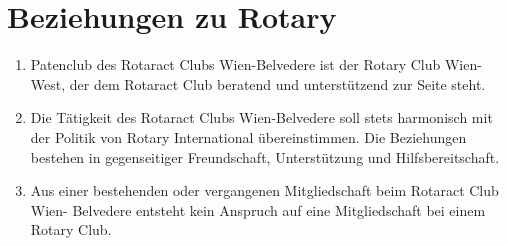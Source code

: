 \documentclass{statutclass}
\begin{document}
\section{Beziehungen zu Rotary}
\begin{enumerate}
    \item Patenclub des Rotaract Clubs Wien-Belvedere ist der Rotary Club Wien-West, der dem Rotaract Club beratend und unterstützend zur Seite steht.
    \item Die Tätigkeit des Rotaract Clubs Wien-Belvedere soll stets harmonisch mit der Politik von Rotary International übereinstimmen. Die Beziehungen bestehen in gegenseitiger Freundschaft, Unterstützung und Hilfsbereitschaft.
    \item Aus einer bestehenden oder vergangenen Mitgliedschaft beim Rotaract Club Wien- Belvedere entsteht kein Anspruch auf eine Mitgliedschaft bei einem Rotary Club.
\end{enumerate}
\end{document}
